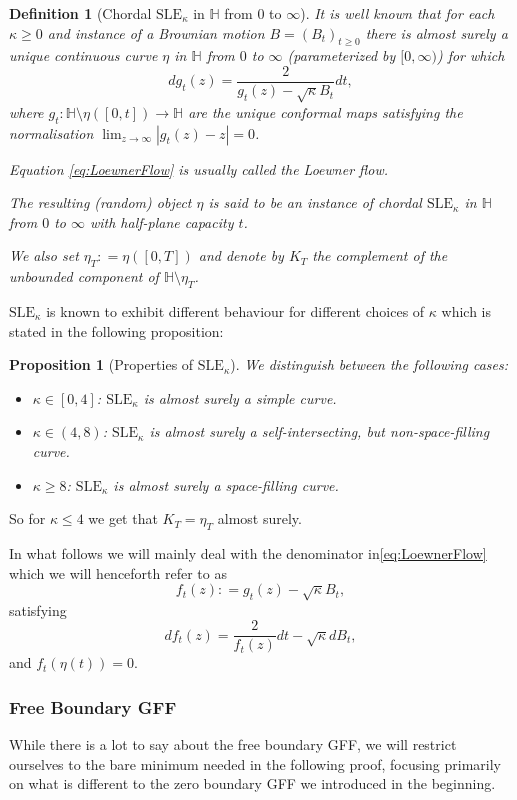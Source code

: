 \documentclass[11pt,reqno]{amsart}
\numberwithin{equation}{section}
\newtheorem{pro}[thm]{Proposition}
\newtheorem{defi}[thm]{Definition}
\newcommand{\deq}{\mathrel{\mathop:}=}
\begin{document}
\begin{defi}[Chordal $\text{SLE}_\kappa$ in $\mathbb H$ from $0$ to $\infty$]
	It is well known that for each $\kappa\geq 0$ and instance of a Brownian motion $B=(B_t)_{t\geq 0}$ there is almost surely a unique continuous curve $\eta$ in $\mathbb H$ from $0$ to $\infty$ (parameterized by $[0,\infty)$) for which
	\begin{equation}\label{eq:LoewnerFlow}
		dg_t(z)=\frac{2}{g_t(z)-\sqrt\kappa B_t}dt,
	\end{equation}
where $g_t:\mathbb H\setminus\eta([0,t])\rightarrow\mathbb H$ are the unique conformal maps satisfying the normalisation $\lim_{z\rightarrow\infty}|g_t(z)-z|=0$.

Equation \eqref{eq:LoewnerFlow} is usually called the Loewner flow.

The resulting (random) object $\eta$ is said to be an instance of chordal $\text{SLE}_\kappa$ in $\mathbb H$ from $0$ to $\infty$ with half-plane capacity $t$.

We also set $\eta_T\deq\eta([0,T])$ and denote by $K_T$ the complement of the unbounded component of $\mathbb H\setminus\eta_T$.
\end{defi}
$\text{SLE}_\kappa$ is known to exhibit different behaviour for different choices of $\kappa$ which is stated in the following proposition:
\begin{pro}[Properties of $\text{SLE}_\kappa$] We distinguish between the following cases:
	\begin{itemize}
		\item $\kappa\in[0,4]$: $\text{SLE}_\kappa$ is almost surely a simple curve.
		\item $\kappa\in(4,8)$: $\text{SLE}_\kappa$ is almost surely a self-intersecting, but non-space-filling curve.
		\item $\kappa\geq 8$: $\text{SLE}_\kappa$ is almost surely a space-filling curve.
	\end{itemize}
\end{pro}
So for $\kappa\leq 4$ we get that $K_T=\eta_T$ almost surely.

In what follows we will mainly deal with the denominator in\eqref{eq:LoewnerFlow} which we will henceforth refer to as $$f_t(z)\deq g_t(z)-\sqrt{\kappa}B_t,$$ satisfying $$df_t(z)=\frac{2}{f_t(z)}dt-\sqrt\kappa dB_t,$$ and $f_t(\eta(t))=0$.


\subsubsection{Free Boundary GFF}
While there is a lot to say about the free boundary GFF, we will restrict ourselves to the bare minimum needed in the following proof, focusing primarily on what is different to the zero boundary GFF we introduced in the beginning.
\end{document}
